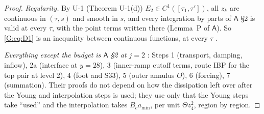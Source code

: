 \documentclass[11pt]{article}
\begin{document}
\begin{proof}
\emph{Regularity.} By U-1 (Theorem U-1(d)) $E_2\in C^1([\tau_1,\tau'])$, all $z_k$ are continuous in $(\tau,s)$ and smooth in $s$, and every integration by parts of $\mathsf A$ \S2 is valid at every $\tau$, with the point terms written there (Lemma~P of $\mathsf A$). So \eqref{G:eq:D1} is an inequality between continuous functions, at every $\tau$ \tH.

\emph{Everything except the budget is $\mathsf A$ \S2 at $j=2$} \tI: Steps 1 (transport, damping, inflow), 2a (interface at $y=28$), 3 (inner-ramp cutoff terms, route IBP for the top pair at level 2), 4 (foot and S33), 5 (outer annulus $O$), 6 (forcing), 7 (summation). Their proofs do not depend on how the dissipation left over after the Young and interpolation steps is used; they use only that the Young steps take ``$\mathrm{used}$'' and the interpolation takes $B_ca_{\min}$, per unit $\Theta z_4^2$, region by region.


\end{proof}
\end{document}
